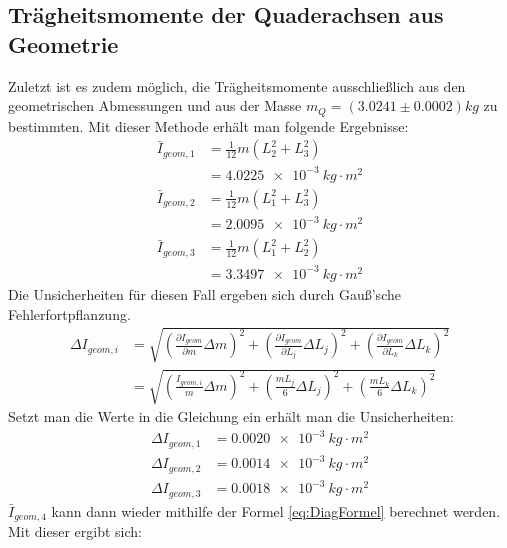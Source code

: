 \documentclass{report}
\begin{document}
\subsection{Trägheitsmomente der Quaderachsen aus Geometrie}
Zuletzt ist es zudem möglich, die Trägheitsmomente ausschließlich aus den geometrischen Abmessungen und aus der Masse $m_Q = (3.0241 \pm 0.0002)kg$ zu bestimmten.
Mit dieser Methode erhält man folgende Ergebnisse:
\begin{equation}
    \begin{split}
        \bar{I}_{geom,1} &= \frac{1}{12}m(L_2^2 + L_3^2) \\
                         &= \qty{4.0225e-3}{kg \cdot m^2} \\
        \bar{I}_{geom,2} &= \frac{1}{12}m(L_1^2 + L_3^2) \\
                         &= \qty{2.0095e-3}{kg \cdot m^2} \\
        \bar{I}_{geom,3} &= \frac{1}{12}m(L_1^2 + L_2^2) \\
                         &= \qty{3.3497e-3}{kg \cdot m^2}                       
    \end{split}
\end{equation}
Die Unsicherheiten für diesen Fall ergeben sich durch Gauß'sche Fehlerfortpflanzung.
\begin{equation}
    \begin{split}
        \Delta I_{geom, i} &= \sqrt{\left(\frac{\partial I_{geom}}{\partial m} \Delta m\right)^2 + \left(\frac{\partial I_{geom}}{\partial L_j} \Delta L_j\right)^2 + \left(\frac{\partial I_{geom}}{\partial L_k} \Delta L_k\right)^2} \\
                           &= \sqrt{\left(\frac{I_{geom, i}}{m} \Delta m\right)^2 + \left(\frac{mL_j}{6} \Delta L_j\right)^2 + \left(\frac{m L_k}{6} \Delta L_k\right)^2}
    \end{split}
\end{equation}
Setzt man die Werte in die Gleichung ein erhält man die Unsicherheiten:
\begin{equation}
    \begin{split}
        \Delta I_{geom, 1} &= \qty{0.0020e-3}{kg \cdot m^2} \\
        \Delta I_{geom, 2} &= \qty{0.0014e-3}{kg \cdot m^2} \\
        \Delta I_{geom, 3} &= \qty{0.0018e-3}{kg \cdot m^2}
    \end{split}
\end{equation}
$\bar{I}_{geom, 4}$ kann dann wieder mithilfe der Formel \ref{eq:DiagFormel} berechnet werden. Mit dieser ergibt sich:
\end{document}
